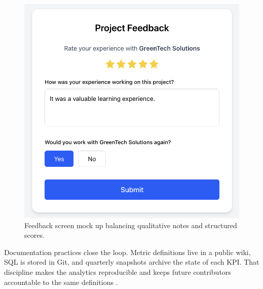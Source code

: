 \begin{figure}[H]
  \centering
  \includegraphics[width=0.8\linewidth]{figures/Student-Project-Feedback.png}
  \caption{Feedback screen mock up balancing qualitative notes and structured scores.}
  \label{fig:feedback-screen}
\end{figure}

Documentation practices close the loop. Metric definitions live in a public wiki, SQL is stored in Git, and quarterly snapshots archive the state of each KPI. That discipline makes the analytics reproducible and keeps future contributors accountable to the same definitions \citep{Choudary2016}.
